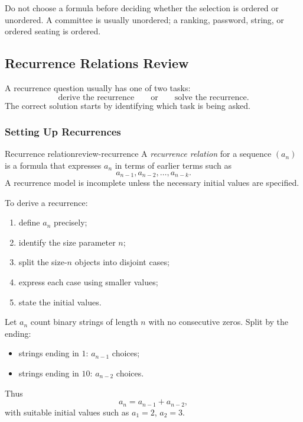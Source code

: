 \begin{commonmistake}[title={The most common counting error}]
Do not choose a formula before deciding whether the selection is ordered or unordered. A committee is usually unordered; a ranking, password, string, or ordered seating is ordered.
\end{commonmistake}

\subsection{Recurrence Relations Review}

A recurrence question usually has one of two tasks:
\[
\text{derive the recurrence}
\qquad\text{or}\qquad
\text{solve the recurrence}.
\]
The correct solution starts by identifying which task is being asked.

\subsubsection{Setting Up Recurrences}

\begin{definition}{Recurrence relation}{review-recurrence}
A \emph{recurrence relation} for a sequence \((a_n)\) is a formula that expresses \(a_n\) in terms of earlier terms such as
\[
a_{n-1},a_{n-2},\dots,a_{n-k}.
\]
A recurrence model is incomplete unless the necessary initial values are specified.
\end{definition}

\begin{examtip}[title={Deriving a recurrence}]
To derive a recurrence:
\begin{enumerate}[leftmargin=*]
    \item define \(a_n\) precisely;
    \item identify the size parameter \(n\);
    \item split the size-\(n\) objects into disjoint cases;
    \item express each case using smaller values;
    \item state the initial values.
\end{enumerate}
\end{examtip}

\begin{examplebox}[title={Typical Fibonacci-type recurrence}]
Let \(a_n\) count binary strings of length \(n\) with no consecutive zeros. Split by the ending:
\begin{itemize}[leftmargin=*]
    \item strings ending in \(1\): \(a_{n-1}\) choices;
    \item strings ending in \(10\): \(a_{n-2}\) choices.
\end{itemize}
Thus
\[
a_n=a_{n-1}+a_{n-2},
\]
with suitable initial values such as \(a_1=2\), \(a_2=3\).
\end{examplebox}

